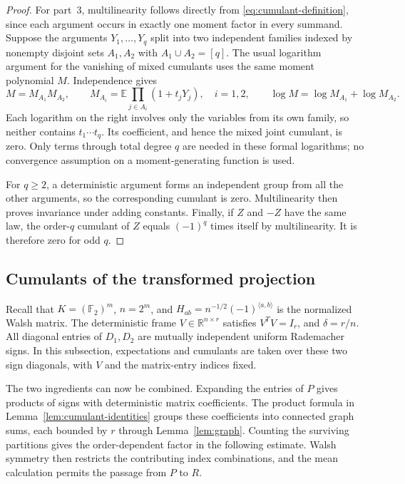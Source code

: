 \documentclass[11pt]{article}
\theoremstyle{definition}
\theoremstyle{remark}
\theoremstyle{plain}
\newcommand{\E}{\mathbb E}
\newcommand{\F}{\mathbb F}
\newcommand{\R}{\mathbb R}
\begin{document}
\begin{proof}
For part~3, multilinearity follows directly from
\eqref{eq:cumulant-definition}, since each argument occurs in
exactly one moment factor in every summand.
Suppose the arguments $Y_1,\ldots,Y_q$ split into two
independent families indexed by nonempty disjoint sets $A_1,A_2$
with $A_1\cup A_2=[q]$. The usual logarithm argument for the
vanishing of mixed cumulants
\cite[\S3.B, lemma on p.~324]{leonov_shiryaev1959}
uses the same moment polynomial $M$. Independence gives
\[
 M=M_{A_1}M_{A_2},\qquad
 M_{A_i}=\E\prod_{j\in A_i}(1+t_jY_j),\quad i=1,2,
 \qquad \log M=\log M_{A_1}+\log M_{A_2}.
\]
Each logarithm on the right involves only the variables from its
own family, so neither contains $t_1\cdots t_q$. Its coefficient,
and hence the mixed joint cumulant, is zero. Only terms through
total degree $q$ are needed in these formal logarithms; no
convergence assumption on a moment-generating function is used.

For $q\ge2$, a deterministic argument forms an independent group
from all the other arguments, so the corresponding cumulant is
zero. Multilinearity then proves invariance under adding constants.
Finally, if $Z$ and $-Z$ have the same law, the order-$q$ cumulant
of $Z$ equals $(-1)^q$ times itself by multilinearity. It is
therefore zero for odd $q$.
\end{proof}

\subsection{Cumulants of the transformed projection}
\label{sec:projection-cumulants}

Recall that $K=(\F_2)^m$, $n=2^m$, and
$H_{ab}=n^{-1/2}(-1)^{\langle a,b\rangle}$ is the normalized Walsh
matrix. The deterministic frame $V\in\R^{n\times r}$ satisfies
$V^TV=I_r$, and $\delta=r/n$. All diagonal entries of $D_1,D_2$
are mutually independent uniform Rademacher signs. In this subsection,
expectations and cumulants are taken over these two sign diagonals,
with $V$ and the matrix-entry indices fixed.

The two ingredients can now be combined. Expanding the entries of $P$
gives products of signs with deterministic matrix coefficients.
The product formula in Lemma~\ref{lem:cumulant-identities}
groups these coefficients into
connected graph sums, each bounded by $r$ through Lemma~\ref{lem:graph}.
Counting the surviving partitions gives the order-dependent factor
in the following estimate. Walsh symmetry then restricts
the contributing index combinations, and the mean calculation permits
the passage from $P$ to $R$.
\end{document}

